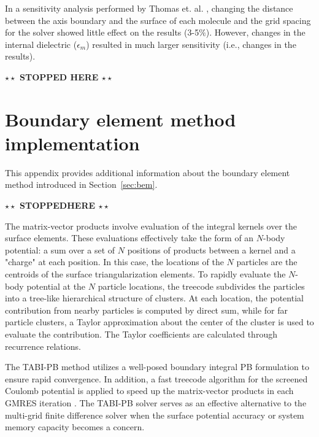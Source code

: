 \documentclass[11pt,titlepage]{article}
\newcommand{\todo}[1]{\textbf{$\star \star$ {#1} $\star \star$}}
\begin{document}
In a sensitivity analysis performed by Thomas et. al. \cite{thomas2013}, changing the distance between the axis boundary and the surface of each molecule and the grid spacing for the solver showed little effect on the results (3-5$\%$). However, changes in the internal dielectric ($\epsilon_m$) resulted in much larger sensitivity (i.e., changes in the results).

\todo{STOPPED HERE}

\section{Boundary element method implementation} \label{app:bem}
This appendix provides additional information about the boundary element method introduced in Section~\ref{sec:bem}.

\todo{STOPPEDHERE}

The matrix-vector products involve evaluation of the integral kernels over the surface elements. These evaluations effectively take the form of an $N$-body potential: a sum over a set of $N$ positions of products between a kernel and a "charge" at each position. In this case, the locations of the $N$ particles are the centroids of the surface triangularization elements. To rapidly evaluate the $N$-body potential at the $N$ particle locations, the treecode subdivides the particles into a tree-like hierarchical structure of clusters. At each location, the potential contribution from nearby particles is computed by direct sum, while for far particle clusters, a Taylor approximation about the center of the cluster is used to evaluate the contribution. The Taylor coefficients are calculated through recurrence relations. 

The TABI-PB method utilizes a well-posed boundary integral PB formulation to ensure rapid convergence. In addition, a fast treecode algorithm for the screened Coulomb potential  is applied to speed up the matrix-vector products in each GMRES iteration \cite{Juffer1991}. The TABI-PB solver serves as an effective alternative to the multi-grid finite difference solver when the surface potential accuracy or system memory capacity becomes a concern.
\end{document}
